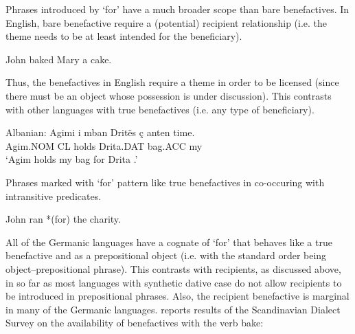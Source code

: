 \documentclass[11pt]{upenndiss}
\begin{document}
Phrases introduced by `for' have a much broader scope than bare benefactives. In English, bare benefactive require a (potential) recipient relationship (i.e. the theme needs to be at least intended for the beneficiary).

\begin{exe}
	\ex John baked Mary a cake.
	\begin{xlist}
	\end{xlist}
\end{exe}

Thus, the benefactives in English require a theme in order to be licensed (since there must be an object whose possession is under discussion). This contrasts with other languages with true benefactives (i.e. any type of beneficiary). 

\begin{exe}
	\ex Albanian:
	\gll Agimi i mban Drit\"es {\c{c} anten} time.\\
	Agim.NOM CL holds Drita.DAT bag.ACC my\\
	\trans `Agim holds my bag for Drita \citep[ex 8a]{McGinnis.2001b}.'
\end{exe}

Phrases marked with `for' pattern like true benefactives in co-occuring with intransitive predicates.

\begin{exe}
	\ex John ran *(for) the charity.
\end{exe}

All of the Germanic languages have a cognate of `for' that behaves like a true benefactive and as a prepositional object (i.e. with the standard order being object--prepositional phrase). This contrasts with recipients, as discussed above, in so far as most languages with synthetic dative case do not allow recipients to be introduced in prepositional phrases.
Also, the recipient benefactive is marginal in many of the Germanic languages. \cite{Lundquist.2013b} reports results of the Scandinavian Dialect Survey on the availability of benefactives with the verb bake:
\end{document}
